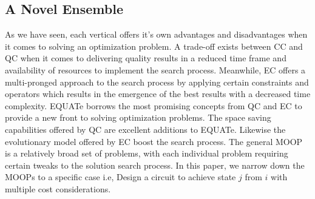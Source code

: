 \documentclass[conference]{IEEEtran}
\begin{document}
\subsection{A Novel Ensemble}
As we have seen, each vertical offers it's own advantages and disadvantages when it comes to solving an optimization problem. A trade-off exists between CC and QC when it comes to delivering quality results in a reduced time frame and availability of resources to implement the search process. Meanwhile, EC offers a multi-pronged approach to the search process by applying certain constraints and operators which results in the emergence of the best results with a decreased time complexity. EQUATe borrows the most promising concepts from QC and EC to provide a new front to solving optimization problems. The space saving capabilities offered by QC are excellent additions to EQUATe. Likewise the evolutionary model offered by EC boost the search process. The general MOOP is a relatively broad set of problems, with each individual problem requiring certain tweaks to the solution search process. In this paper, we narrow down the MOOPs to a specific case i.e, Design a circuit to achieve state $j$ from $i$ with multiple cost considerations. 
% 
% 
\end{document}
